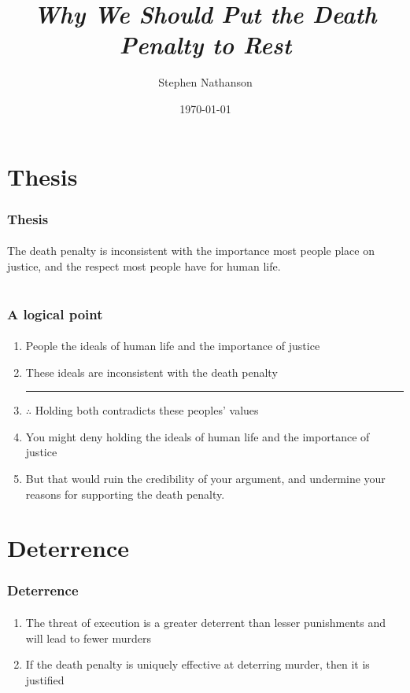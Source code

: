 \documentclass{beamer}
\begin{document}
\title{\emph{Why We Should Put the Death Penalty to Rest}}
\author{Stephen Nathanson} %
\date{\today}

\section{Thesis}

\begin{frame}
    \frametitle{Thesis}
    \framesubtitle{}

The death penalty is inconsistent with the importance most people place 
on justice, and the respect most people have for human life.

\end{frame}

\section{}    

\begin{frame}
    \frametitle{A logical point}
    \framesubtitle{}

\begin{enumerate}
\item People the ideals of human life and the importance of justice
\item These ideals are inconsistent with the death penalty \\
\rule {1in}{.5pt}
\item $\therefore$ Holding both contradicts these peoples' values

\pause
\item You might deny holding the ideals of human life and the importance 
of justice
\item But that would ruin the credibility of your argument, and 
undermine your reasons for supporting the death penalty.

\end{enumerate}


\end{frame}

\section{Deterrence}

\begin{frame}
    \frametitle{Deterrence}
    \framesubtitle{}
\begin{enumerate}
\item The threat of execution is a greater deterrent than lesser 
punishments and will lead to fewer murders
\item If the death penalty is uniquely effective at deterring murder, 
then it is justified


\end{enumerate}



\end{frame}
\end{document}
